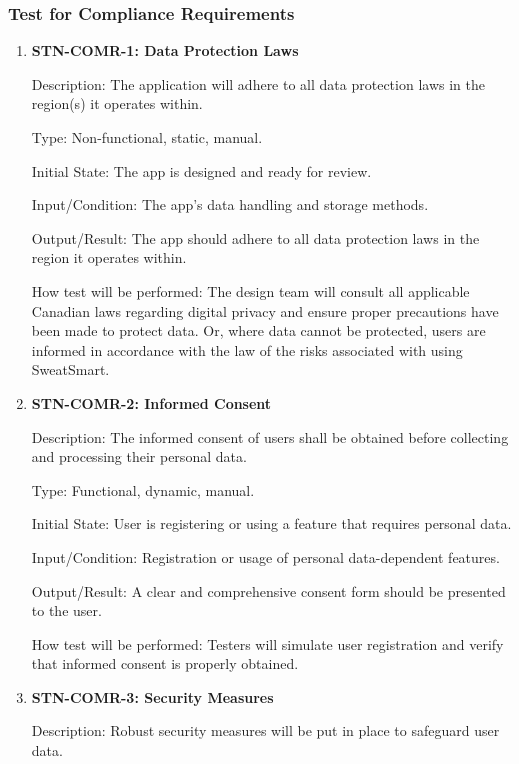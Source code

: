 \documentclass[12pt, titlepage]{article}
\begin{document}
    \subsubsection{Test for Compliance Requirements}

    \begin{enumerate}

        \item {\textbf{STN-COMR-1: Data Protection Laws}}

        Description: The application will adhere to all data protection laws in the region(s) it operates within.

        Type: Non-functional, static, manual.

        Initial State: The app is designed and ready for review.

        Input/Condition: The app's data handling and storage methods.

        Output/Result: The app should adhere to all data protection laws in the region it operates within.

        How test will be performed: The design team will consult all applicable Canadian laws regarding digital privacy and ensure proper precautions have been made to protect data. Or, where data cannot be protected, users are informed in accordance with the law of the risks associated with using SweatSmart.

        \item{\textbf{STN-COMR-2: Informed Consent}}

        Description: The informed consent of users shall be obtained before collecting and processing their personal data.

        Type: Functional, dynamic, manual.

        Initial State: User is registering or using a feature that requires personal data.

        Input/Condition: Registration or usage of personal data-dependent features.

        Output/Result: A clear and comprehensive consent form should be presented to the user.

        How test will be performed: Testers will simulate user registration and verify that informed consent is properly obtained.


        \item{\textbf{STN-COMR-3: Security Measures}}

        Description: Robust security measures will be put in place to safeguard user data.


\end{enumerate}
\end{document}
